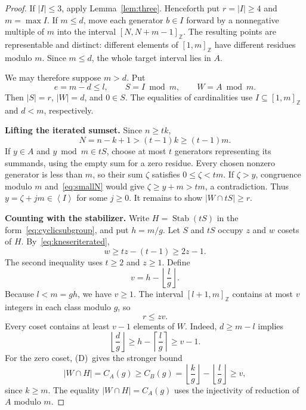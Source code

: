 \documentclass[11pt,a4paper]{article}
\numberwithin{equation}{section}
\theoremstyle{remark}
\newcommand{\Z}{\mathbb Z}
\newcommand{\sg}[1]{\left\langle #1\right\rangle}
\newcommand{\floor}[1]{\left\lfloor #1\right\rfloor}
\newcommand{\ceil}[1]{\left\lceil #1\right\rceil}
\DeclareMathOperator{\Stab}{Stab}
\newcommand{\Dcond}{\textup{(D)}}
\newcommand{\interval}[2]{[#1,#2]_{\Z}}
\begin{document}
\begin{proof}
If $|I|\le3$, apply Lemma~\ref{lem:three}.
Henceforth put $r=|I|\ge4$ and $m=\max I$.
If $m\le d$, move each generator $b\in I$ forward by a nonnegative
multiple of $m$ into the interval $\interval{N}{N+m-1}$.
The resulting points are representable and distinct: different
elements of $\interval{1}{m}$ have different residues modulo $m$.
Since $m\le d$, the whole target interval lies in $A$.

We may therefore suppose $m>d$. Put
\[
  e=m-d\le l,\qquad
  S=I\bmod m,\qquad W=A\bmod m.
\]
Then $|S|=r$, $|W|=d$, and $0\in S$.
The equalities of cardinalities use $I\subseteq\interval{1}{m}$
and $d<m$, respectively.

\textbf{Lifting the iterated sumset.}
Since $n\ge tk$,
\begin{equation}\label{eq:smallN}
  N=n-k+1>(t-1)k\ge(t-1)m.
\end{equation}
If $y\in A$ and $y\bmod m\in tS$, choose at most $t$ generators
representing its summands, using the empty sum for a zero residue.
Every chosen nonzero generator is less than $m$, so their sum $\zeta$
satisfies $0\le \zeta<tm$.
If $\zeta>y$, congruence modulo $m$ and~\eqref{eq:smallN} would give
$\zeta\ge y+m>tm$, a contradiction.
Thus $y=\zeta+jm\in\sg{I}$ for some $j\ge0$.
It remains to show $|W\cap tS|\ge r$.

\textbf{Counting with the stabilizer.}
Write $H=\Stab(tS)$ in the form~\eqref{eq:cyclicsubgroup}, and put
$h=m/g$. Let $S$ and $tS$ occupy $z$ and $w$ cosets of $H$.
By~\eqref{eq:kneseriterated},
\begin{equation}\label{eq:smallkneser}
  w\ge tz-(t-1)\ge2z-1.
\end{equation}
The second inequality uses $t\ge2$ and $z\ge1$.
Define
\[
  v=h-\floor{\frac{l}{g}}.
\]
Because $l<m=gh$, we have $v\ge1$.
The interval $\interval{l+1}{m}$ contains at most $v$ integers
in each class modulo $g$, so
\begin{equation}\label{eq:smallcapacity}
  r\le zv.
\end{equation}
Every coset contains at least $v-1$ elements of $W$.
Indeed, $d\ge m-l$ implies
\[
  \floor{\frac{d}{g}}
  \ge h-\ceil{\frac{l}{g}}
  \ge v-1.
\]
For the zero coset, \Dcond\ gives the stronger bound
\begin{equation}\label{eq:smallzero}
  |W\cap H|=C_A(g)\ge C_B(g)
  =\floor{\frac{k}{g}}-\floor{\frac{l}{g}}\ge v,
\end{equation}
since $k\ge m$.
The equality $|W\cap H|=C_A(g)$ uses the injectivity of reduction
of $A$ modulo $m$.


\end{proof}
\end{document}
